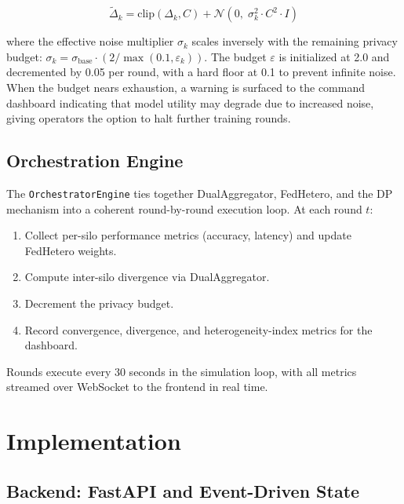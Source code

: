 \documentclass[conference]{IEEEtran}
\begin{document}
\begin{equation}
\tilde{\Delta}_k = \text{clip}(\Delta_k, C) + \mathcal{N}\!\left(0,\; \sigma_k^2 \cdot C^2 \cdot I\right)
\label{eq:dp_noise}
\end{equation}

\noindent where the effective noise multiplier $\sigma_k$ scales inversely with the remaining privacy budget: $\sigma_k = \sigma_{\text{base}} \cdot (2 / \max(0.1, \varepsilon_k))$. The budget $\varepsilon$ is initialized at 2.0 and decremented by 0.05 per round, with a hard floor at 0.1 to prevent infinite noise. When the budget nears exhaustion, a warning is surfaced to the command dashboard indicating that model utility may degrade due to increased noise, giving operators the option to halt further training rounds.

\subsection{Orchestration Engine}

The \texttt{OrchestratorEngine} ties together DualAggregator, FedHetero, and the DP mechanism into a coherent round-by-round execution loop. At each round $t$:

\begin{enumerate}
    \item Collect per-silo performance metrics (accuracy, latency) and update FedHetero weights.
    \item Compute inter-silo divergence via DualAggregator.
    \item Decrement the privacy budget.
    \item Record convergence, divergence, and heterogeneity-index metrics for the dashboard.
\end{enumerate}

Rounds execute every 30 seconds in the simulation loop, with all metrics streamed over WebSocket to the frontend in real time.

\section{Implementation}

\subsection{Backend: FastAPI and Event-Driven State}
\end{document}
